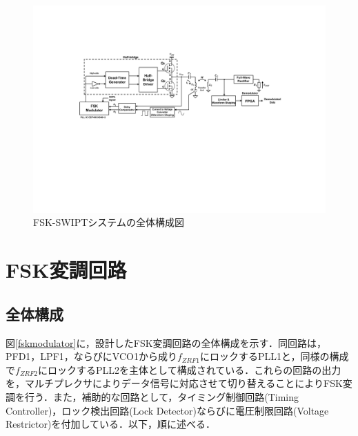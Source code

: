 \begin{figure}[h]
\begin{center}

\includegraphics[width=160mm]{figures/fskentirecircuit.pdf}
\caption{FSK-SWIPTシステムの全体構成図}
\label{fskentirecircuit}
\end{center}

\end{figure}

\section{FSK変調回路}
\subsection{全体構成}
図\ref{fskmodulator}に，設計したFSK変調回路の全体構成を示す．同回路は，PFD1，LPF1，ならびにVCO1から成り$f_{ZRF1}$にロックするPLL1と，同様の構成で$f_{ZRF2}$にロックするPLL2を主体として構成されている．これらの回路の出力を，マルチプレクサによりデータ信号に対応させて切り替えることによりFSK変調を行う．また，補助的な回路として，タイミング制御回路(Timing Controller)，ロック検出回路(Lock Detector)ならびに電圧制限回路(Voltage Restrictor)を付加している．以下，順に述べる．

